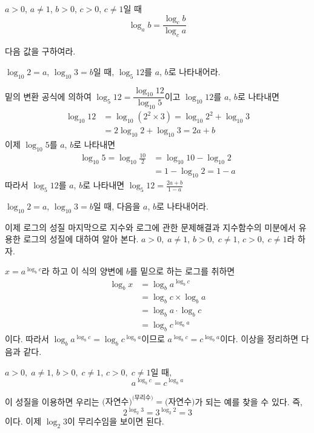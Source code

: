 \documentclass[11pt, a4paper]{book}
\begin{document}
\begin{theorem}[밑의 변환 공식]
	$a>0$, $a\ne1$, $b>0$, $c>0$, $c\ne1$일 때 
	\[
	\log_{a}b =\frac{\log_{c}b}{\log_{c}a}
	\]
\end{theorem}


\begin{sample}
\end{sample}
\begin{problem}
	다음 값을 구하여라.
\end{problem}

\begin{example}
	$\log_{10}2=a$, $\log_{10}3=b$일 때, $\log_{5}12$를 $a$, $b$로 나타내어라.
	\begin{solution}
		 밑의 변환 공식에 의하여   $\log_{5}12 =\dfrac{\log_{10}12}{\log_{10}5}$이고
		$\log_{10}12$를 $a$, $b$로 나타내면 
		\begin{align*}
			\log_{10}12 &=\log_{10}(2^{2}\times 3)=\log_{10}2^{2}+\log_{10}3\\
			 &=2\log_{10}2 +\log_{10}3 = 2a+b
		\end{align*}
		이제 $\log_{10}5$를 $a$, $b$로 나타내면     
		\begin{align*}
		\log_{10}5 =\log_{10}\frac{10}{2}&=\log_{10}10 -\log_{10}2\\
		&=1-\log_{10}2=1-a
		\end{align*}
		따라서 $\log_{5}12$를 $a$, $b$로 나타내면  $\log_{5}12 =\frac{2a+b}{1-a}$
	\end{solution}
\end{example}

\begin{problem}
	$\log_{10}2=a$, $\log_{10}3=b$일 때, 다음을 $a$, $b$로 나타내어라.
\end{problem}
이제 로그의 성질 마지막으로 지수와 로그에 관한 문제해결과 지수함수의 미분에서 유용한 로그의 성질에 대하여 알아 본다.
$a>0, \; a \ne 1$, $b>0, \; c \ne 1$, $c>0, \; c \ne 1$라 하자.

$x = a^{\log_{b}c}$라 하고 이 식의 양변에 $b$를 밑으로 하는 로그를 취하면
\begin{align*}
	\log_{b}x &= \log_{b}a^{\log_{b}c} \\
					&= \log_{b}c \times \log_{b}a \\
					&= \log_{b}a \cdot \log_{b}c \\
					&=\log_{b}c^{\log_{b}a}
\end{align*}
이다. 따라서 $\log_{b}a^{\log_{b}c} = \log_{b}c^{\log_{b}a}$이므로 $a^{\log_{b}c} = c^{\log_{b}a}$이다.
이상을 정리하면 다음과 같다.
\begin{theorem}
	$a>0, \; a \ne 1$, $b>0, \; c \ne 1$, $c>0, \; c \ne 1$일 때,
	\[
	a^{\log_{b}c} = c^{\log_{b}a}
	\]
\end{theorem}
  이 성질을 이용하면 우리는 $\text{(자연수)}^{\text{(무리수)}}=\text{(자연수)}$가 되는 예를 찾을 수 있다. 즉, 
  \[
    2^{\log_{2}3} = 3^{\log_{2}2} =3
  \]
  이다. 이제 $\log_{2}3$이 무리수임을 보이면 된다. 
  
\end{document}
